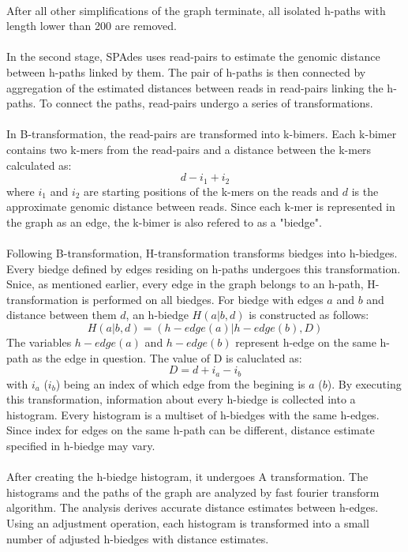 \paragraph*{}
After all other simplifications of the graph terminate, all isolated h-paths with length lower than 200 are removed.
\paragraph*{}
In the second stage, SPAdes uses read-pairs to estimate the genomic distance between h-paths linked by them. The pair of h-paths is then connected by aggregation of the estimated distances between reads in read-pairs linking the h-paths. To connect the paths, read-pairs undergo a series of transformations. 
\paragraph*{}
In B-transformation, the read-pairs are transformed into k-bimers. Each k-bimer contains two k-mers from the read-pairs and a distance between the k-mers calculated as:
\[d - i_{1} + i_{2}\]
where $i_{1}$ and $i_{2}$ are starting positions of the k-mers on the reads and $d$ is the approximate genomic distance between reads. Since each k-mer is represented in the graph as an edge, the k-bimer is also refered to as a "biedge".
\paragraph*{}
Following B-transformation, H-transformation transforms biedges into h-biedges. Every biedge defined by edges residing on h-paths undergoes this transformation. Snice, as mentioned earlier, every edge in the graph belongs to an h-path, H-transformation is performed on all biedges. For biedge with edges $a$ and $b$ and distance between them $d$, an h-biedge $H(a|b,d)$ is constructed as follows:
\[ H(a|b,d) = (h-edge(a)|h-edge(b),D) \]
The variables $h-edge(a)$ and $h-edge(b)$ represent h-edge on the same h-path as the edge in question. The value of D is caluclated as:
\[D = d + i_{a} - i_{b}\]
with $i_{a}$ ($i_{b}$) being an index of which edge from the begining is $a$ ($b$). By executing this transformation, information about every h-biedge is collected into a histogram. Every histogram is a multiset of h-biedges with the same h-edges. Since index for edges on the same h-path can be different, distance estimate specified in h-biedge may vary.
\paragraph*{}
After creating the h-biedge histogram, it undergoes A transformation. The histograms and the paths of the graph are analyzed by fast fourier transform algorithm. The analysis derives accurate distance estimates between h-edges. Using an adjustment operation, each histogram is transformed into a small number of adjusted h-biedges with distance estimates.
